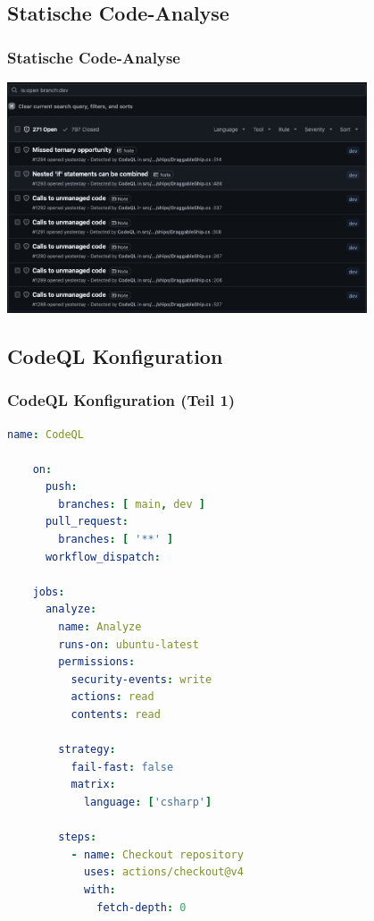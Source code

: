 \documentclass{beamer}
\begin{document}
\subsection{Statische Code-Analyse}
\begin{frame}
\frametitle{Statische Code-Analyse}
  \center
  \includegraphics[width=0.8\textwidth]{github-sec.png}
\end{frame}

\subsection{CodeQL Konfiguration}
\begin{frame}[fragile]
\frametitle{CodeQL Konfiguration (Teil 1)}
  \begin{lstlisting}[language=yaml, basicstyle=\ttfamily\tiny, breaklines=true]
    name: CodeQL

    on:
      push:
        branches: [ main, dev ]
      pull_request:
        branches: [ '**' ]
      workflow_dispatch:

    jobs:
      analyze:
        name: Analyze
        runs-on: ubuntu-latest
        permissions:
          security-events: write
          actions: read
          contents: read

        strategy:
          fail-fast: false
          matrix:
            language: ['csharp']

        steps:
          - name: Checkout repository
            uses: actions/checkout@v4
            with:
              fetch-depth: 0
  \end{lstlisting}
\end{frame}
\end{document}
